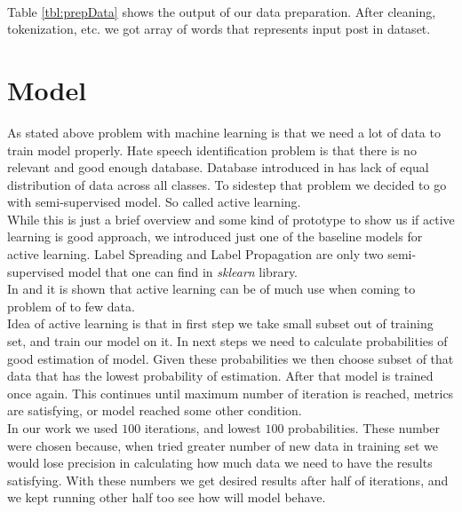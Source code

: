 \documentclass[10pt, a4paper]{article}
\begin{document}
\\Table \ref{tbl:prepData} shows the output of our data preparation. After cleaning, tokenization, etc. we got array of words that represents input post in dataset.

\section{Model}
As stated above problem with machine learning is that we need a lot of data to train model properly. Hate speech identification problem is that there is no relevant and good enough database. Database introduced in \cite{Davidson2017AutomatedHS} has lack of equal distribution of data across all classes. To sidestep that problem we decided to go with semi-supervised model. So called active learning.
\\While this is just a brief overview and some kind of prototype to show us if active learning is good approach, we introduced just one of the baseline models for active learning. Label Spreading and Label Propagation are only two semi-supervised model that one can find in \textit{sklearn} library.
\\In \cite{LuoALPlankton} and \cite{YangMultiClassAL} it is shown that active learning can be of much use when coming to problem of to few data.
\\Idea of active learning is that in first step we take small subset out of training set, and train our model on it. In next steps we need to calculate probabilities of good estimation of model. Given these probabilities we then choose subset of that data that has the lowest probability of estimation. After that model is trained once again. This continues until maximum number of iteration is reached, metrics are satisfying, or model reached some other condition.
\\In our work we used $100$ iterations, and lowest $100$ probabilities. These number were chosen because, when tried greater number of new data in training set we would lose precision in calculating how much data we need to have the results satisfying. With these numbers we get desired results after half of iterations, and we kept running other half too see how will model behave.
\end{document}
